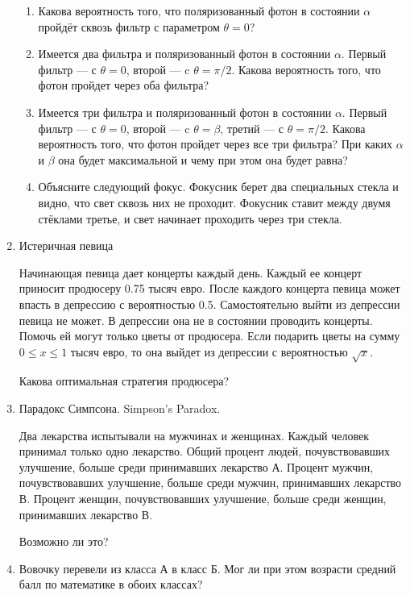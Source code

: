 \documentclass{tufte-handout}
\begin{document}
\begin{enumerate}
\begin{enumerate}
\item Какова вероятность того, что поляризованный фотон в состоянии $\alpha$ пройдёт сквозь фильтр с параметром $\theta=0$?
\item Имеется два фильтра и поляризованный фотон в состоянии $\alpha$. Первый фильтр --- с $\theta=0$, второй --- c $\theta=\pi/2$. Какова вероятность того, что фотон пройдет через оба фильтра?
\item Имеется три фильтра и поляризованный фотон в состоянии $\alpha$. Первый фильтр --- с $\theta=0$, второй --- c $\theta=\beta$, третий --- с $\theta=\pi/2$. Какова вероятность того, что фотон пройдет через все три фильтра? При каких $\alpha$ и $\beta$ она будет максимальной и чему при этом она будет равна?
\item Объясните следующий фокус. Фокусник берет два специальных стекла и видно, что свет сквозь них не проходит. Фокусник ставит между двумя стёклами третье, и свет начинает проходить через три стекла. 
\end{enumerate}


\item Истеричная певица

Начинающая певица дает концерты каждый день. Каждый ее концерт приносит продюсеру 0.75 тысяч евро. После каждого концерта певица может впасть в депрессию с вероятностью 0.5. Самостоятельно выйти из депрессии певица не может. В депрессии она не в состоянии проводить концерты. Помочь ей могут только цветы от продюсера. Если подарить цветы на сумму $0\le x\le 1$ тысяч евро, то она выйдет из депрессии с вероятностью $\sqrt{x}$. 

Какова оптимальная стратегия продюсера? 

\item Парадокс Симпсона.  Simpson's Paradox.

Два лекарства испытывали на мужчинах и женщинах. Каждый
человек принимал только одно лекарство. Общий процент людей,
почувствовавших улучшение, больше среди принимавших лекарство А.
Процент мужчин, почувствовавших улучшение, больше среди мужчин, принимавших лекарство В. Процент женщин, почувствовавших улучшение, больше среди женщин, принимавших лекарство В. 

Возможно ли это? 

\item Вовочку перевели из класса А в класс Б. Мог ли при этом возрасти средний балл по математике в обоих классах?


\end{enumerate}
\end{document}
